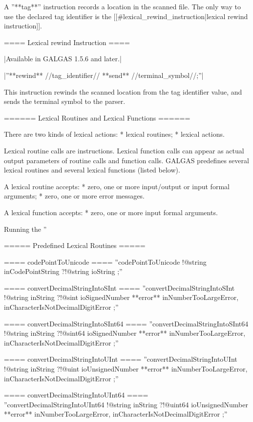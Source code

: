 A ''**tag**'' instruction records a location in the scanned file. The only way to use the declared tag identifier is the [[\#lexical\_rewind\_instruction|lexical rewind instruction]].

==== Lexical rewind Instruction ====

|Available in GALGAS 1.5.6 and later.|

|''**rewind** //tag\_identifier// **send** //terminal\_symbol//;''|

This instruction rewinds the scanned location from the tag identifier value, and sends the terminal symbol to the parser.

====== Lexical Routines and Lexical Functions ======


There are two kinds of lexical actions:
  * lexical routines;
  * lexical actions.

Lexical routine calls are instructions. Lexical function calls can appear as actual output parameters of routine calls and function calls. GALGAS predefines several lexical routines and several lexical functions (listed below).

A lexical routine accepts:
  * zero, one or more input/output or input formal arguments;
  * zero, one or more error messages.

A lexical function accepts:
  * zero, one or more input formal arguments.

Running the ''%

===== Predefined Lexical Routines =====


==== codePointToUnicode ====
''codePointToUnicode !@string inCodePointString ?!@string ioString ;''

==== convertDecimalStringIntoSInt ====
''convertDecimalStringIntoSInt !@string inString ?!@sint ioSignedNumber **error** inNumberTooLargeError, inCharacterIsNotDecimalDigitError ;''

==== convertDecimalStringIntoSInt64 ====
''convertDecimalStringIntoSInt64 !@string inString ?!@sint64 ioSignedNumber **error** inNumberTooLargeError, inCharacterIsNotDecimalDigitError ;''

==== convertDecimalStringIntoUInt ====
''convertDecimalStringIntoUInt !@string inString ?!@uint ioUnsignedNumber **error** inNumberTooLargeError, inCharacterIsNotDecimalDigitError ;''

==== convertDecimalStringIntoUInt64 ====
''convertDecimalStringIntoUInt64 !@string inString ?!@uint64 ioUnsignedNumber **error** inNumberTooLargeError, inCharacterIsNotDecimalDigitError ;''

